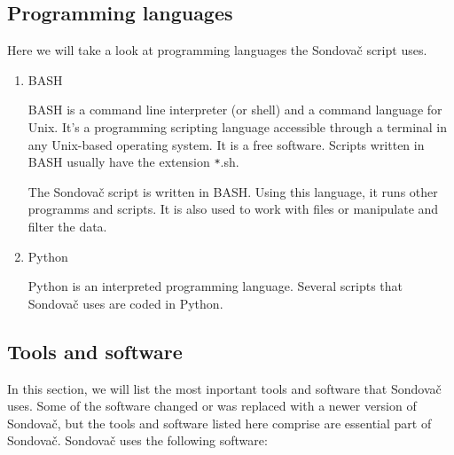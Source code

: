 \subsection{Programming languages}
Here we will take a look at programming languages the Sondovač script uses. 

\begin{enumerate}
\item BASH

BASH is a command line interpreter (or shell) and a command language for Unix. It's a programming scripting language accessible through a terminal in 
any Unix-based operating system. It is a free software. Scripts written in BASH usually have the extension \verb_*_.sh. 

The Sondovač script is written in BASH. Using this language, it runs other programms and scripts. It is also used to work with files or manipulate and filter the data. 

\item Python

Python is an interpreted programming language. 
Several scripts that Sondovač uses are coded in Python. 

\end{enumerate}

\subsection{Tools and software}

In this section, we will list the most inportant tools and software that Sondovač uses. Some of the software changed or was replaced with a newer version of Sondovač, 
but the tools and software listed here comprise are essential part of Sondovač. 
Sondovač uses the following software: 

